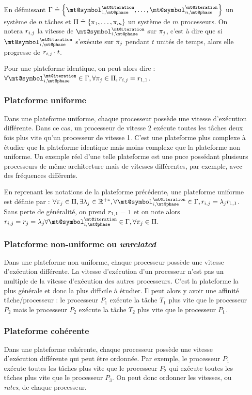 En définissant $\tset\defeq\set{\task{1},\dotsc,\task{n}}$ un système de $n$ tâches et $\Pi\doteq\left\{\pi_{1},\dotsc,\pi_{m}\right\}$ un système de $m$ processeurs. On notera $r_{i,j}$ la vitesse de $\task{i}$ sur $\pi_{j}$, c'est à dire que si $\task{i}$ s'exécute sur $\pi_{j}$ pendant $t$ unités de temps, alors elle progresse de $r_{i,j}\cdot t$.

Pour une plateforme identique, on peut alors dire :
$\forall \task{i}\in\tset,\forall\proc{j}\in\pset,\trate{i}{j}=\trate{1}{1}$. 



\subsubsection{Plateforme uniforme}
Dans une plateforme uniforme, chaque processeur possède une vitesse d'exécution différente. Dans ce cas, un processeur de vitesse 2 exécute toutes les tâches deux fois plus vite qu'un processeur de vitesse 1. C'est une plateforme plus complexe à étudier que la plateforme identique mais moins complexe que la plateforme non uniforme. Un exemple réel d'une telle plateforme est une puce possédant plusieurs processeurs de même architecture mais de vitesses différentes, par exemple, avec des fréquences différents. 

En reprenant les notations de la plateforme précédente, une plateforme uniforme est définie par :
$\forall\proc{j}\in\pset,\exists\lambda_j\in\mathbb{R}^{+*},\forall\task{i}\in\tset,\trate{i}{j}=\lambda_j\trate{1}{1}$. Sans perte de généralité, on prend $r_{1,1}=1$ et on note alors $\trate{i}{j}=\rate{j}=\lambda_j \forall\task{i}\in\tset,\forall\proc{j}\in\pset$.

\subsubsection{Plateforme non-uniforme ou \textit{unrelated}}
Dans une plateforme non uniforme, chaque processeur possède une vitesse d'exécution différente. La vitesse d'exécution d'un processeur n'est pas un multiple de la vitesse d'exécution des autres processeurs. C'est la plateforme la plus générale et donc la plus difficile à étudier. Il peut alors y avoir une affinité tâche/processeur : le processeur $P_1$ exécute la tâche $T_1$ plus vite que le processeur $P_2$ mais le processeur $P_2$ exécute la tâche $T_2$ plus vite que le processeur $P_1$.

\subsubsection{Plateforme cohérente}
Dans une plateforme cohérente, chaque processeur possède une vitesse d'exécution différente qui peut être ordonnée. Par exemple, le processeur $P_1$ exécute toutes les tâches plus vite que le processeur $P_2$ qui exécute toutes les tâches plus vite que le processeur $P_3$. On peut donc ordonner les vitesses, ou \textit{rates}, de chaque processeur.

